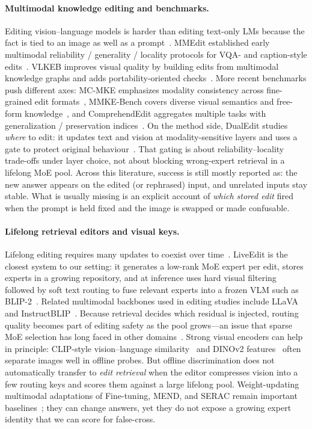 \documentclass[letterpaper]{article} %
\begin{document}
\paragraph{Multimodal knowledge editing and benchmarks.}
Editing vision--language models is harder than editing text-only LMs because the fact is tied to an image as well as a prompt~\citep{cheng2023mmedit}.
MMEdit established early multimodal reliability / generality / locality protocols for VQA- and caption-style edits~\citep{cheng2023mmedit}.
VLKEB improves visual quality by building edits from multimodal knowledge graphs and adds portability-oriented checks~\citep{huang2024vlkeb}.
More recent benchmarks push different axes: MC-MKE emphasizes modality consistency across fine-grained edit formats~\citep{zhang2025mcmke}, MMKE-Bench covers diverse visual semantics and free-form knowledge~\citep{du2025mmkebench}, and ComprehendEdit aggregates multiple tasks with generalization / preservation indices~\citep{ma2025comprehendedit}.
On the method side, DualEdit studies \emph{where} to edit: it updates text and vision at modality-sensitive layers and uses a gate to protect original behaviour~\citep{shi2025dualedit}.
That gating is about reliability--locality trade-offs under layer choice, not about blocking wrong-expert retrieval in a lifelong MoE pool.
Across this literature, success is still mostly reported as: the new answer appears on the edited (or rephrased) input, and unrelated inputs stay stable.
What is usually missing is an explicit account of \emph{which stored edit} fired when the prompt is held fixed and the image is swapped or made confusable.

\paragraph{Lifelong retrieval editors and visual keys.}
Lifelong editing requires many updates to coexist over time~\citep{hartvigsen2023grace,chen2025liveedit}.
LiveEdit is the closest system to our setting: it generates a low-rank MoE expert per edit, stores experts in a growing repository, and at inference uses hard visual filtering followed by soft text routing to fuse relevant experts into a frozen VLM such as BLIP-2~\citep{chen2025liveedit,li2023blip2}.
Related multimodal backbones used in editing studies include LLaVA and InstructBLIP~\citep{liu2023llava,dai2023instructblip}.
Because retrieval decides which residual is injected, routing quality becomes part of editing safety as the pool grows---an issue that sparse MoE selection has long faced in other domains~\citep{shazeer2017moe}.
Strong visual encoders can help in principle: CLIP-style vision--language similarity~\citep{radford2021clip} and DINOv2 features~\citep{oquab2024dinov2} often separate images well in offline probes.
But offline discrimination does not automatically transfer to \emph{edit retrieval} when the editor compresses vision into a few routing keys and scores them against a large lifelong pool.
Weight-updating multimodal adaptations of Fine-tuning, MEND, and SERAC remain important baselines~\citep{mitchell2022mend,mitchell2022serac,cheng2023mmedit}; they can change answers, yet they do not expose a growing expert identity that we can score for false-cross.
\end{document}
